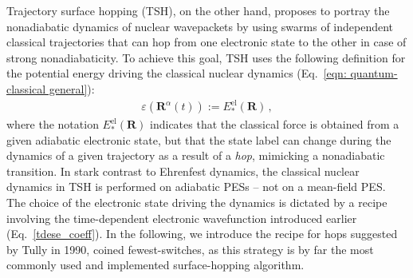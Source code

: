 \documentclass[9pt,bestpractices]{livecoms}
\newcommand{\bs}{\mathbf}
\begin{document}
Trajectory surface hopping (TSH), on the other hand, proposes to portray the nonadiabatic dynamics of nuclear wavepackets by using swarms of independent classical trajectories that can hop from one electronic state to the other in case of strong nonadiabaticity.\cite{bjerre1967energy,preston71} To achieve this goal, TSH uses the following definition for the potential energy driving the classical nuclear dynamics (Eq.~\eqref{eqn: quantum-classical general}):
\begin{align}
 \varepsilon(\bs R^{\alpha}(t)) := E_\ast^{\text{el}}(\bs R) \, ,
\label{ehrenfest2}
\end{align}
where the notation $E_\ast^{\text{el}}(\bs R)$ indicates that the classical force is obtained from a given adiabatic electronic state, but that the state label can change during the dynamics of a given trajectory as a result of a \textit{hop}, mimicking a nonadiabatic transition. In stark contrast to Ehrenfest dynamics, the classical nuclear dynamics in TSH is performed on adiabatic PESs -- not on a mean-field PES. The choice of the electronic state driving the dynamics is dictated by a recipe involving the time-dependent electronic wavefunction introduced earlier (Eq.~\eqref{tdese_coeff}). In the following, we introduce the recipe for hops suggested by Tully in 1990,\cite{tully90} coined fewest-switches, as this strategy is by far the most commonly used and implemented surface-hopping algorithm.  
\end{document}
